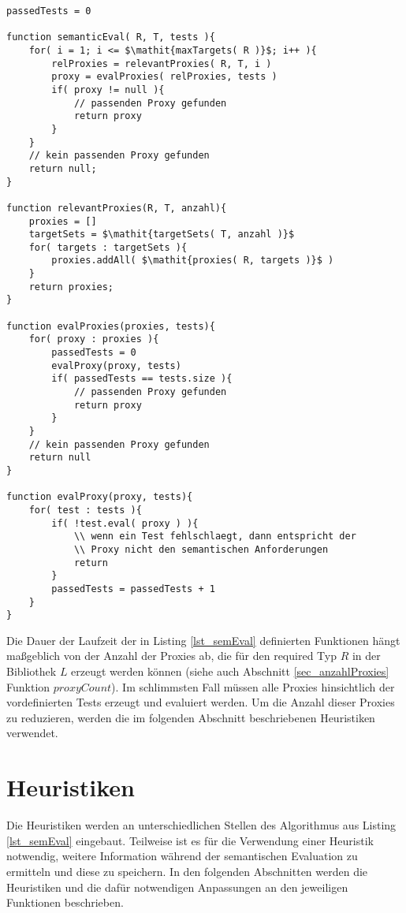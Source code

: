 \begin{lstlisting}[style = pseudo, caption = Semantische Evaluation ohne Heuristiken, captionpos = b, label = lst_semEval]
passedTests = 0

function semanticEval( R, T, tests ){
	for( i = 1; i <= $\mathit{maxTargets( R )}$; i++ ){
		relProxies = relevantProxies( R, T, i )
		proxy = evalProxies( relProxies, tests )	
		if( proxy != null ){
			// passenden Proxy gefunden
			return proxy
		}
	}
	// kein passenden Proxy gefunden
	return null;
}

function relevantProxies(R, T, anzahl){
	proxies = []
	targetSets = $\mathit{targetSets( T, anzahl )}$
	for( targets : targetSets ){
		proxies.addAll( $\mathit{proxies( R, targets )}$ )
	}
	return proxies;
}

function evalProxies(proxies, tests){
	for( proxy : proxies ){
		passedTests = 0
		evalProxy(proxy, tests)
		if( passedTests == tests.size ){
			// passenden Proxy gefunden
			return proxy
		}
	}
	// kein passenden Proxy gefunden
	return null
}

function evalProxy(proxy, tests){
	for( test : tests ){
		if( !test.eval( proxy ) ){
			\\ wenn ein Test fehlschlaegt, dann entspricht der 
			\\ Proxy nicht den semantischen Anforderungen
			return
		}
		passedTests = passedTests + 1
	}
}
\end{lstlisting}
Die Dauer der Laufzeit der in Listing \ref{lst_semEval} definierten Funktionen hängt maßgeblich von der Anzahl der Proxies ab, die für den required Typ $R$ in der Bibliothek $L$ erzeugt werden können (siehe auch Abschnitt \ref{sec_anzahlProxies} Funktion $\mathit{proxyCount}$). Im schlimmsten Fall müssen alle Proxies hinsichtlich der vordefinierten Tests erzeugt und evaluiert werden. Um die Anzahl dieser Proxies zu reduzieren, werden die im folgenden Abschnitt beschriebenen Heuristiken verwendet.


\section{Heuristiken}
Die Heuristiken werden an unterschiedlichen Stellen des Algorithmus aus Listing \ref{lst_semEval} eingebaut. Teilweise ist es für die Verwendung einer Heuristik notwendig, weitere Information während der semantischen Evaluation zu ermitteln und diese zu speichern. In den folgenden Abschnitten werden die Heuristiken und die dafür notwendigen Anpassungen an den jeweiligen Funktionen beschrieben.

